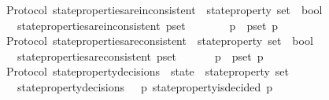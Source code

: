 \begin{isabellebody}
{\isafoldproof}%
%
\isadelimproof
\isanewline
%
\endisadelimproof
\isanewline
\isanewline
{}\isamarkupfalse%
\ {\isacharparenleft}\ Protocol{\isacharparenright}\ state{\isacharunderscore}properties{\isacharunderscore}are{\isacharunderscore}inconsistent\ {\isacharcolon}{\isacharcolon}\ {\isachardoublequoteopen}state{\isacharunderscore}property\ set\ {\isasymRightarrow}\ bool{\isachardoublequoteclose}\isanewline
\ \ \isanewline
\ \ \ \ {\isachardoublequoteopen}state{\isacharunderscore}properties{\isacharunderscore}are{\isacharunderscore}inconsistent\ p{\isacharunderscore}set\ {\isacharequal}\ {\isacharparenleft}{\isasymforall}\ {\isasymsigma}\ {\isasymin}\ {\isasymSigma}{\isachardot}\ {\isasymnot}\ {\isacharparenleft}{\isasymforall}\ p\ {\isasymin}\ p{\isacharunderscore}set{\isachardot}\ p\ {\isasymsigma}{\isacharparenright}{\isacharparenright}{\isachardoublequoteclose}\isanewline
\isanewline
\isanewline
{}\isamarkupfalse%
\ {\isacharparenleft}\ Protocol{\isacharparenright}\ state{\isacharunderscore}properties{\isacharunderscore}are{\isacharunderscore}consistent\ {\isacharcolon}{\isacharcolon}\ {\isachardoublequoteopen}state{\isacharunderscore}property\ set\ {\isasymRightarrow}\ bool{\isachardoublequoteclose}\isanewline
\ \ \isanewline
\ \ \ \ {\isachardoublequoteopen}state{\isacharunderscore}properties{\isacharunderscore}are{\isacharunderscore}consistent\ p{\isacharunderscore}set\ {\isacharequal}\ {\isacharparenleft}{\isasymexists}\ {\isasymsigma}\ {\isasymin}\ {\isasymSigma}{\isachardot}\ {\isasymforall}\ p\ {\isasymin}\ p{\isacharunderscore}set{\isachardot}\ p\ {\isasymsigma}{\isacharparenright}{\isachardoublequoteclose}\isanewline
\isanewline
\isanewline
{}\isamarkupfalse%
\ {\isacharparenleft}\ Protocol{\isacharparenright}\ state{\isacharunderscore}property{\isacharunderscore}decisions\ {\isacharcolon}{\isacharcolon}\ {\isachardoublequoteopen}state\ {\isasymRightarrow}\ state{\isacharunderscore}property\ set{\isachardoublequoteclose}\isanewline
\ \ \ \isanewline
\ \ \ \ {\isachardoublequoteopen}state{\isacharunderscore}property{\isacharunderscore}decisions\ {\isasymsigma}\ {\isacharequal}\ {\isacharbraceleft}p{\isachardot}\ state{\isacharunderscore}property{\isacharunderscore}is{\isacharunderscore}decided\ {\isacharparenleft}p{\isacharcomma}\ {\isasymsigma}{\isacharparenright}{\isacharbraceright}{\isachardoublequoteclose}\isanewline
\isanewline
\isanewline
{}\isamarkupfalse%

\end{isabellebody}

